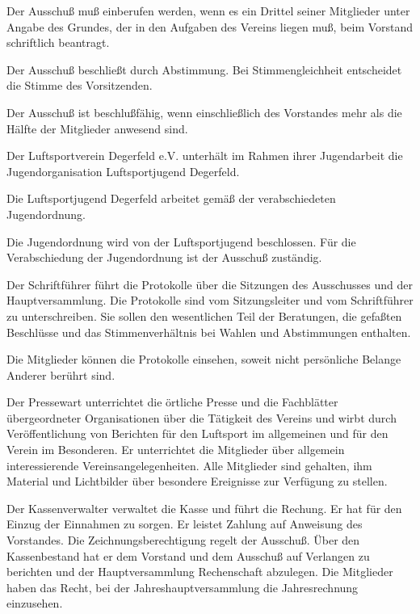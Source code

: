 \documentclass[11pt,a4paper,parskip=half]{scrartcl}
\begin{document}
\begin{contract}
\begin{multicols}{2}
		Der Ausschuß muß einberufen werden, wenn es
		ein Drittel seiner Mitglieder unter Angabe des
		Grundes, der in den Aufgaben des Vereins liegen
		muß, beim Vorstand schriftlich beantragt.
		
		Der Ausschuß beschließt durch Abstimmung. Bei
		Stimmengleichheit entscheidet die Stimme des
		Vorsitzenden.
		
		Der Ausschuß ist beschlußfähig, wenn
		einschließlich des Vorstandes mehr als die Hälfte
		der Mitglieder anwesend sind.
		
		Der Luftsportverein Degerfeld e.V. unterhält im
		Rahmen ihrer Jugendarbeit die
		Jugendorganisation Luftsportjugend Degerfeld.
		
		Die Luftsportjugend Degerfeld arbeitet gemäß
		der verabschiedeten Jugendordnung.
		
		Die Jugendordnung wird von der
		Luftsportjugend beschlossen. Für die
		Verabschiedung der Jugendordnung ist der
		Ausschuß zuständig.
		
		Der Schriftführer führt die Protokolle über die
		Sitzungen des Ausschusses und der
		Hauptversammlung. Die Protokolle sind vom
		Sitzungsleiter und vom Schriftführer zu
		unterschreiben. Sie sollen den wesentlichen Teil
		der Beratungen, die gefaßten Beschlüsse und das
		Stimmenverhältnis bei Wahlen und Abstimmungen
		enthalten.
		
		Die Mitglieder können die Protokolle einsehen,
		soweit nicht persönliche Belange Anderer berührt
		sind.
		
		Der Pressewart unterrichtet die örtliche Presse und
		die Fachblätter übergeordneter Organisationen
		über die Tätigkeit des Vereins und wirbt durch
		Veröffentlichung von Berichten für den Luftsport
		im allgemeinen und für den Verein im Besonderen.
		Er unterrichtet die Mitglieder über allgemein
		interessierende Vereinsangelegenheiten. Alle
		Mitglieder sind gehalten, ihm Material und
		Lichtbilder über besondere Ereignisse zur
		Verfügung zu stellen.
		
		Der Kassenverwalter verwaltet die Kasse und
		führt die Rechung. Er hat für den Einzug der
		Einnahmen zu sorgen. Er leistet Zahlung auf
		Anweisung des Vorstandes. Die
		Zeichnungsberechtigung regelt der Ausschuß. Über
		den Kassenbestand hat er dem Vorstand und dem
		Ausschuß auf Verlangen zu berichten und der
		Hauptversammlung Rechenschaft abzulegen. Die
		Mitglieder haben das Recht, bei der
		Jahreshauptversammlung die Jahresrechnung
		einzusehen.
		

\end{multicols}
\end{contract}
\end{document}
